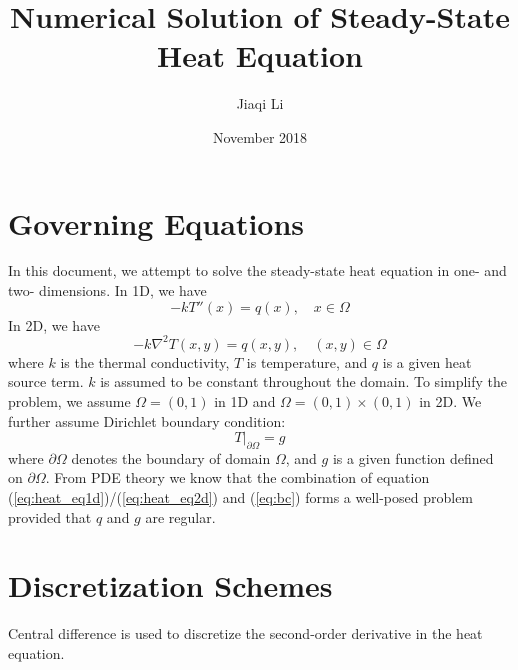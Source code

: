 \documentclass{article}
\title{Numerical Solution of Steady-State Heat Equation}
\author{Jiaqi Li}
\date{November 2018}
\begin{document}
\maketitle

\section{Governing Equations}

In this document, we attempt to solve the steady-state heat equation in one- and two- dimensions.
In 1D, we have
\begin{equation} \label{eq:heat_eq1d}
    -kT''(x) = q(x),\quad x \in \Omega
\end{equation}
In 2D, we have
\begin{equation} \label{eq:heat_eq2d}
    -k \nabla^2 T(x,y) = q(x,y),\quad (x,y) \in \Omega
\end{equation}
where $k$ is the thermal conductivity, $T$ is temperature, and $q$ is a given heat source term. $k$
is assumed to be constant throughout the domain. To simplify the problem, we assume $\Omega = (0,1)$ in 1D and 
$\Omega = (0, 1) \times (0, 1)$ in 2D. We further assume Dirichlet boundary condition:
\begin{equation} \label{eq:bc}
    T|_{\partial \Omega} = g
\end{equation}
where $\partial \Omega$ denotes the boundary of domain $\Omega$, and $g$ is a given function defined on $\partial \Omega$. From PDE theory we know that the combination of equation (\ref{eq:heat_eq1d})/(\ref{eq:heat_eq2d}) and (\ref{eq:bc}) forms a well-posed problem provided
that $q$ and $g$ are regular.


\section{Discretization Schemes}
Central difference is used to discretize the second-order derivative in the heat equation. 
\end{document}
